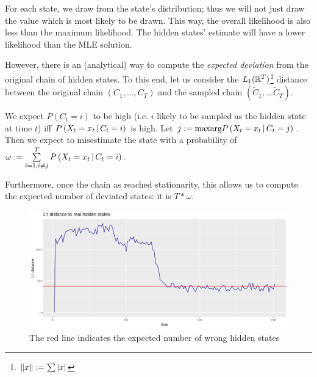 For each state, we draw from the state's distribution; thus we will not just draw the value which is most likely to be drawn. This way, the overall likelihood is also less than the maximum likelihood. The hidden states' estimate will have a lower likelihood than the MLE solution. 

However, there is an (analytical) way to compute the \textit{expected deviation} from the original chain of hidden states. 
To this end, let us consider the $L_1(\mathbb{R}^T)$\footnote{$\left\lVert x\right\rVert := \sum |x|$} distance between the original chain $\left(C_1, \dots, C_T\right)$ and the sampled chain $\left(\tilde{C}_1, \dots \tilde{C}_T\right)$. 

We expect $P(C_t = i)$ to be high (i.e. $i$ likely to be sampled as the hidden state at time $t$) iff $P\left(X_t = x_t \, | \,  C_t = i\right)$ is high. Let $j := \text{maxarg} P\left(X_t = x_t \, | \, C_t = j\right)$. Then we expect to misestimate the state with a probability of $\omega := \sum\limits_{i = 1, i \neq j}^T P\left(X_t = x_t \, | \, C_t = i\right)$. 

Furthermore, once the chain as reached stationarity, this allows us to compute the expected number of deviated states: it is $ T * \omega$. 

\begin{figure}
	\includegraphics[width=\linewidth]{../forward_algorithm/l1_hidden_state_distance.png}
	\caption{The red line indicates the expected number of wrong hidden states}
	\label{l1_wrong_states}
\end{figure}









